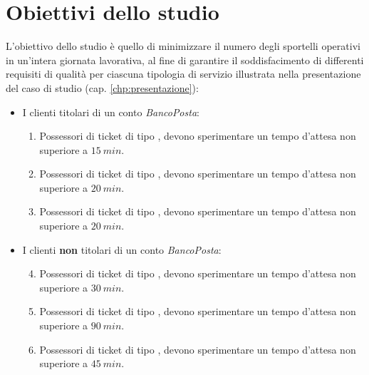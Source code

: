 \chapter{Obiettivi dello studio}\label{chp:obiettivi}
L'obiettivo dello studio è quello di minimizzare il numero degli sportelli operativi in un'intera giornata lavorativa, al fine di garantire il soddisfacimento di differenti requisiti di qualità per ciascuna tipologia di servizio illustrata nella presentazione del caso di studio (cap. \ref{chp:presentazione}):

\begin{itemize}
\item I clienti titolari di un conto \textsl{BancoPosta}:
\begin{enumerate}[label=QoS-\arabic*), align=left, leftmargin=*]
\item Possessori di ticket di tipo \uo{}, devono sperimentare un tempo d'attesa non superiore a $15\ min$.
\item Possessori di ticket di tipo \pp{}, devono sperimentare un tempo d'attesa non superiore a $20\ min$.
\item Possessori di ticket di tipo \sr{}, devono sperimentare un tempo d'attesa non superiore a $20\ min$.
\end{enumerate}
\item I clienti \textbf{non} titolari di un conto \textsl{BancoPosta}:
\begin{enumerate}[label=QoS-\arabic*), align=left, leftmargin=*]
\setcounter{enumi}{3}
\item Possessori di ticket di tipo \uo{}, devono sperimentare un tempo d'attesa non superiore a $30\ min$.
\item Possessori di ticket di tipo \pp{}, devono sperimentare un tempo d'attesa non superiore a $90\ min$.
\item Possessori di ticket di tipo \sr{}, devono sperimentare un tempo d'attesa non superiore a $45\ min$.
\end{enumerate}
\end{itemize}